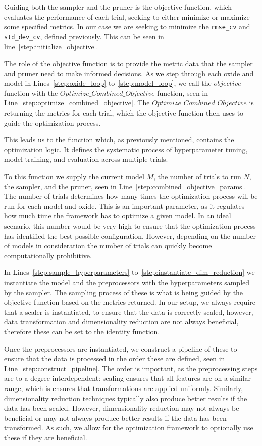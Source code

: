Guiding both the sampler and the pruner is the objective function, which evaluates the performance of each trial, seeking to either minimize or maximize some specified metrics.
In our case we are seeking to minimize the \texttt{rmse\_cv} and \texttt{std\_dev\_cv}, defined previously.
This can be seen in line~\ref{step:initialize_objective}.

The role of the objective function is to provide the metric data that the sampler and pruner need to make informed decisions.
As we step through each oxide and model in Lines~\ref{step:oxide_loop} to~\ref{step:model_loop}, we call the $objective$ function with the $Optimize\_Combined\_Objective$ function, seen in Line~\ref{step:optimize_combined_objective}.
The $Optimize\_Combined\_Objective$ is returning the metrics for each trial, which the objective function then uses to guide the optimization process.

This leads us to the  function which, as previously mentioned, contains the optimization logic.
It defines the systematic process of hyperparameter tuning, model training, and evaluation across multiple trials.

To this function we supply the current model $M$, the number of trials to run $N$, the sampler, and the pruner, seen in Line~\ref{step:combined_objective_params}.
The number of trials determines how many times the optimization process will be run for each model and oxide.
This is an important parameter, as it regulates how much time the framework has to optimize a given model.
In an ideal scenario, this number would be very high to ensure that the optimization process has identified the best possible configuration.
However, depending on the number of models in consideration the number of trials can quickly become computationally prohibitive.

In Lines~\ref{step:sample_hyperparameters} to~\ref{step:instantiate_dim_reduction} we instantiate the model and the preprocessors with the hyperparameters sampled by the sampler.
The sampling process of these is what is being guided by the objective function based on the metrics returned.
In our setup, we always require that a scaler is instantiated, to ensure that the data is correctly scaled, however, data transformation and dimensionality reduction are not always beneficial, therefore these can be set to the identity function.

Once the preprocessors are instantiated, we construct a pipeline of these to ensure that the data is processed in the order these are defined, seen in Line~\ref{step:construct_pipeline}.
The order is important, as the preprocessing steps are to a degree interdependent: scaling ensures that all features are on a similar range, which is ensures that transformations are applied uniformly.
Similarly, dimensionality reduction techniques typically also produce better results if the data has been scaled.
However, dimensionality reduction may not always be beneficial or may not always produce better results if the data has been transformed.
As such, we allow for the optimization framework to optionally use these if they are beneficial.


